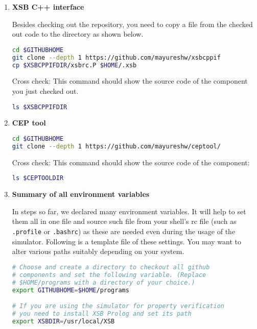 \documentclass[12pt,a4paper]{article}
\begin{document}
\begin{enumerate}
\item \textbf{XSB C++ interface}

\verifonly

Besides checking out the repository, you need to copy a file from the checked out code to the directory as shown below.

\begin{lstlisting}[language=bash,style=snippet]
cd $GITHUBHOME
git clone --depth 1 https://github.com/mayureshw/xsbcppif
cp $XSBCPPIFDIR/xsbrc.P $HOME/.xsb
\end{lstlisting}

Cross check: This command should show the source code of the component you just checked out.

\begin{lstlisting}[language=bash,style=snippet]
ls $XSBCPPIFDIR
\end{lstlisting}

\item \textbf{CEP tool}

\verifonly

\begin{lstlisting}[language=bash,style=snippet]
cd $GITHUBHOME
git clone --depth 1 https://github.com/mayureshw/ceptool/
\end{lstlisting}

Cross check: This command should show the source code of the component:

\begin{lstlisting}[language=bash,style=snippet]
ls $CEPTOOLDIR
\end{lstlisting}

\item \textbf{Summary of all environment variables}

In steps so far, we declared many environment variables. It will help to set them all in one file and source such file from your shell's rc file (such as \texttt{.profile} or \texttt{.bashrc}) as these are needed even during the usage of the simulator. Following is a template file of these settings. You may want to alter various paths suitably depending on your system.

\begin{lstlisting}[language=bash,style=snippet]
# Choose and create a directory to checkout all github
# components and set the following variable. (Replace
# $HOME/programs with a directory of your choice.)
export GITHUBHOME=$HOME/programs

# If you are using the simulator for property verification
# you need to install XSB Prolog and set its path
export XSBDIR=/usr/local/XSB


\end{lstlisting}
\end{enumerate}
\end{document}
